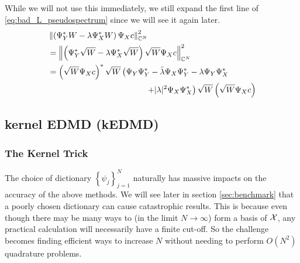 While we will not use this immediately, we still expand the first line of 
\ref{eq:bad_L_pseudospectrum} since we will see it again later. 
\begin{equation}
    \label{eq:L_res_expanded}
    \begin{split}
        &\left\| \left( \Psi_Y^* W - \lambda \Psi_X^* W \right) \Psi_X c \right\|_{\mathbb{C}^N}^2 \\
        &= \left\| \left( \Psi_Y^* \sqrt{W} - \lambda \Psi_X^* \sqrt{W} \right) \sqrt{W} \Psi_X c \right\|_{\mathbb{C}^N}^2 \\
        &= \left( \sqrt{W} \Psi_X c \right)^*
        \sqrt{W} \left( 
            \Psi_Y \Psi_Y^* - \bar{\lambda} \Psi_X \Psi_Y^* - \lambda \Psi_Y \Psi_X^* \right. \\
            & \quad\quad\quad\quad\quad\quad\quad\quad\quad\quad\quad\quad
            \left. + | \lambda |^2 \Psi_X \Psi_X^*
        \right) \sqrt{W}
        \left( \sqrt{W} \Psi_X c \right)
    \end{split}
\end{equation}


\subsection{kernel EDMD (kEDMD)}


\subsubsection{The Kernel Trick}

The choice of dictionary $\left\{ \psi_j \right\}_{j=1}^N$ naturally has massive impacts 
on the accuracy of the above methods. We will see later in section \ref{sec:benchmark} 
that a poorly chosen dictionary can cause catastrophic results. This is because even 
though there may be many ways to (in the limit $N \to \infty$) form a basis of $\mathcal{X}$, 
any practical calculation will necessarily have a finite cut-off. So the challenge 
becomes finding efficient ways to increase $N$ without needing to perform $O(N^2)$ 
quadrature problems. 

